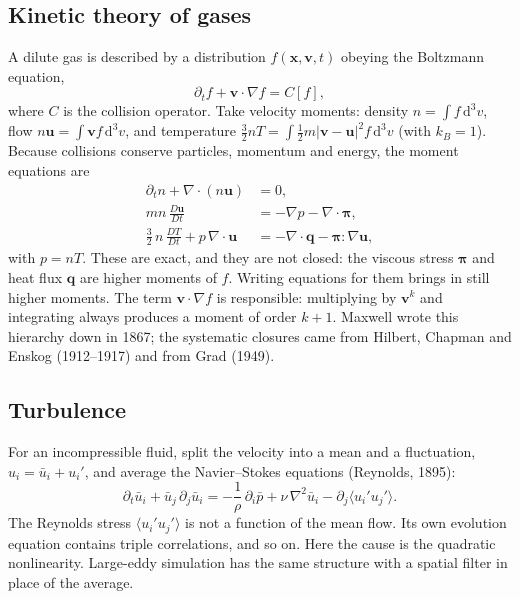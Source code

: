 \documentclass[11pt]{article}
\newcommand{\dd}{\mathrm{d}}
\newcommand{\avg}[1]{\langle #1 \rangle}
\newcommand{\bu}{\mathbf{u}}
\newcommand{\bv}{\mathbf{v}}
\newcommand{\bq}{\mathbf{q}}
\newcommand{\bx}{\mathbf{x}}
\begin{document}
\subsection{Kinetic theory of gases}

A dilute gas is described by a distribution $f(\bx,\bv,t)$ obeying the
Boltzmann equation,
\begin{equation}
  \partial_t f + \bv\cdot\nabla f = C[f],
\end{equation}
where $C$ is the collision operator. Take velocity moments: density
$n = \int f\,\dd^3 v$, flow $n\bu = \int \bv f\,\dd^3 v$, and temperature
$\tfrac{3}{2}nT = \int \tfrac{1}{2}m|\bv-\bu|^2 f\,\dd^3 v$ (with
$k_B = 1$). Because collisions conserve particles, momentum and energy, the
moment equations are
\begin{align}
  \partial_t n + \nabla\cdot(n\bu) &= 0, \\
  mn\,\frac{D\bu}{Dt} &= -\nabla p - \nabla\cdot\boldsymbol{\pi}, \\
  \frac{3}{2}\,n\,\frac{DT}{Dt} + p\,\nabla\cdot\bu
     &= -\nabla\cdot\bq - \boldsymbol{\pi}:\nabla\bu ,
\end{align}
with $p = nT$. These are exact, and they are not closed: the viscous stress
$\boldsymbol{\pi}$ and heat flux $\bq$ are higher moments of $f$. Writing
equations for them brings in still higher moments. The term
$\bv\cdot\nabla f$ is responsible: multiplying by $\bv^k$ and integrating
always produces a moment of order $k+1$. Maxwell wrote this hierarchy down in
1867; the systematic closures came from Hilbert, Chapman and Enskog
(1912--1917) and from Grad (1949).

\subsection{Turbulence}

For an incompressible fluid, split the velocity into a mean and a
fluctuation, $u_i = \bar u_i + u_i'$, and average the Navier--Stokes
equations (Reynolds, 1895):
\begin{equation}
  \partial_t \bar u_i + \bar u_j\,\partial_j \bar u_i
  = -\frac{1}{\rho}\,\partial_i \bar p + \nu\,\nabla^2 \bar u_i
    - \partial_j \avg{u_i' u_j'} .
\end{equation}
The Reynolds stress $\avg{u_i'u_j'}$ is not a function of the mean flow.
Its own evolution equation contains triple correlations, and so on. Here the
cause is the quadratic nonlinearity. Large-eddy simulation has the same
structure with a spatial filter in place of the average.
\end{document}
